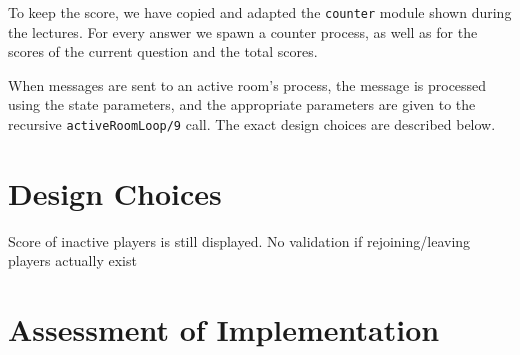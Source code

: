 \documentclass{article}
\begin{document}
To keep the score, we have copied and adapted the \texttt{counter} module shown during the lectures. For every answer we spawn a counter process, as well as for the scores of the current question and the total scores.

When messages are sent to an active room's process, the message is processed using the state parameters, and the appropriate parameters are given to the recursive \texttt{activeRoomLoop/9} call. The exact design choices are described below.

\section{Design Choices}
Score of inactive players is still displayed.
No validation if rejoining/leaving players actually exist
	
	
\section{Assessment of Implementation}
\end{document}
